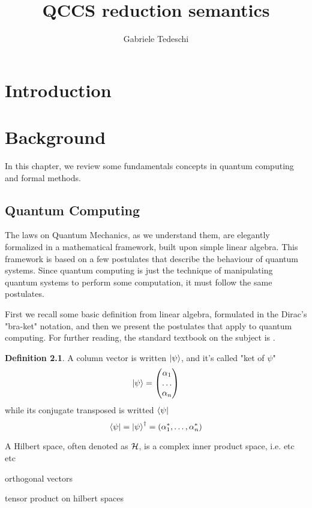 \documentclass[10pt,a4paper, titlepage]{report}
\title{QCCS reduction semantics }
\author{Gabriele Tedeschi}
\theoremstyle{definition}
\newtheorem{definition}{Definition}[section]
\newcommand{\kp}{\ket{\psi}}
\begin{document}
\maketitle

\tableofcontents

\chapter{Introduction}

\chapter{Background}
In this chapter, we review some fundamentals concepts in quantum computing and formal methods.

\section{Quantum Computing}

The laws on Quantum Mechanics, as we understand them, are elegantly formalized in a mathematical framework, built upon simple linear algebra. This framework is based on a few postulates that describe the behaviour of quantum systems. Since quantum computing is just the technique of manipulating quantum systems to perform some computation, it must follow the same postulates. 

First we recall some basic definition from linear algebra, formulated in the Dirac's "bra-ket" notation, and then we present the postulates that apply to quantum computing. For further reading, the standard textbook on the subject is \cite{nielsen_chuang_2010}.


\begin{definition}
A column vector is written $\kp$, and it's called "ket of $\psi$"
\[ \kp = \begin{pmatrix}
		\alpha_1\\
		\ldots\\
		\alpha_n
\end{pmatrix}
\]
while its conjugate transposed is writted $\bra{\psi}$
	\[
		\bra{\psi} = \kp^\dagger = (\alpha_1^*, \ldots, \alpha_n^*)
	\]
\end{definition}

A Hilbert space, often denoted as $\cal{H}$, is a complex inner product space, i.e. etc etc


orthogonal vectors

tensor product on hilbert spaces
\end{document}

